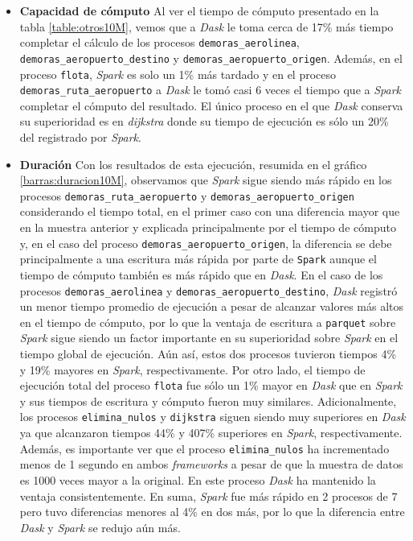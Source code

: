 \begin{itemize}
	\item \textbf{Capacidad de cómputo} Al ver el tiempo de cómputo presentado en la tabla \ref{table:otros10M}, vemos que a \textit{Dask} le toma cerca de 17\% más tiempo completar el cálculo de los procesos \texttt{demoras\_aerolinea}, \texttt{demoras\_aeropuerto\_destino} y \texttt{demoras\_aeropuerto\_origen}. Además, en el proceso \texttt{flota}, \textit{Spark} es solo un 1\% más tardado y en el proceso \texttt{demoras\_ruta\_aeropuerto} a \textit{Dask} le tomó casi 6 veces el tiempo que a \textit{Spark} completar el cómputo del resultado. El único proceso en el que \textit{Dask} conserva su superioridad es en \textit{dijkstra} donde su tiempo de ejecución es sólo un 20\% del registrado por \textit{Spark}. 
	
	\item \textbf{Duración} Con los resultados de esta ejecución, resumida en el gráfico \ref{barras:duracion10M}, observamos que \textit{Spark} sigue siendo más rápido en los procesos \texttt{demoras\_ruta\_aeropuerto} y \texttt{demoras\_aeropuerto\_origen} considerando el tiempo total, en el primer caso con una diferencia mayor que en la muestra anterior y explicada principalmente por el tiempo de cómputo y, en el caso del proceso \texttt{demoras\_aeropuerto\_origen}, la diferencia se debe principalmente a una escritura más rápida por parte de \texttt{Spark} aunque el tiempo de cómputo también es más rápido que en \textit{Dask}. En el caso de los procesos \texttt{demoras\_aerolinea} y \texttt{demoras\_aeropuerto\_destino}, \textit{Dask} registró un menor tiempo promedio de ejecución a pesar de alcanzar valores más altos en el tiempo de cómputo, por lo que la ventaja de escritura a \texttt{parquet} sobre \textit{Spark} sigue siendo un factor importante en su superioridad sobre \textit{Spark} en el tiempo global de ejecución. Aún así, estos dos procesos tuvieron tiempos 4\% y 19\% mayores en \textit{Spark}, respectivamente. Por otro lado, el tiempo de ejecución total del proceso \texttt{flota} fue sólo un 1\% mayor en \textit{Dask} que en \textit{Spark} y sus tiempos de escritura y cómputo fueron muy similares. Adicionalmente, los procesos \texttt{elimina\_nulos} y \texttt{dijkstra} siguen siendo muy superiores en \textit{Dask} ya que alcanzaron tiempos 44\% y 407\% superiores en \textit{Spark}, respectivamente. Además, es importante ver que el proceso \texttt{elimina\_nulos} ha incrementado menos de 1 segundo en ambos \textit{frameworks} a pesar de que la muestra de datos es 1000 veces mayor a la original. En este proceso \textit{Dask} ha mantenido la ventaja consistentemente. En suma, \textit{Spark} fue más rápido en 2 procesos de 7 pero tuvo diferencias menores al 4\% en dos más, por lo que la diferencia entre \textit{Dask} y \textit{Spark} se redujo aún más.

\end{itemize}


